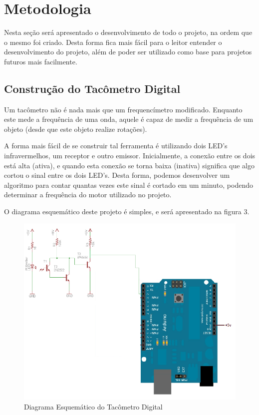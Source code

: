\chapter{Metodologia}
\label{chap:desen}

Nesta seção será apresentado o desenvolvimento de todo o projeto, na ordem que o mesmo foi criado. Desta forma fica mais fácil para o leitor entender o desenvolvimento do projeto, além de poder ser utilizado como base para projetos futuros mais facilmente.

\section{Construção do Tacômetro Digital}
Um tacômetro não é nada mais que um frequencímetro modificado. Enquanto este mede a frequência de uma onda, aquele é capaz de medir a frequência de um objeto (desde que este objeto realize rotações).

A forma mais fácil de se construir tal ferramenta é utilizando dois LED's infravermelhos, um receptor e outro emissor. Inicialmente, a conexão entre os dois está alta (ativa), e quando esta conexão se torna baixa (inativa) significa que algo cortou o sinal entre os dois LED's. Desta forma, podemos desenvolver um algoritmo para contar quantas vezes este sinal é cortado em um minuto, podendo determinar a frequência do motor utilizado no projeto.

O diagrama esquemático deste projeto é simples, e será apresentado na figura 3.

\begin{figure}[!h]
	\centering
	\includegraphics{./tachometer_schematic.png}
	\caption[Diagrama Esquemático do Tacômetro Digital]{Diagrama Esquemático do Tacômetro Digital}
	\label{fig:tachometer_diagram}
\end{figure}

